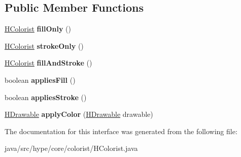\subsection*{Public Member Functions}
\begin{DoxyCompactItemize}
\item 
\hypertarget{interfacehype_1_1core_1_1colorist_1_1_h_colorist_a1d46be9eae6e5b1284e2f2ce235ecbe8}{\hyperlink{interfacehype_1_1core_1_1colorist_1_1_h_colorist}{H\-Colorist} {\bfseries fill\-Only} ()}\label{interfacehype_1_1core_1_1colorist_1_1_h_colorist_a1d46be9eae6e5b1284e2f2ce235ecbe8}

\item 
\hypertarget{interfacehype_1_1core_1_1colorist_1_1_h_colorist_a81c290b73d5f6a86694c00118c523723}{\hyperlink{interfacehype_1_1core_1_1colorist_1_1_h_colorist}{H\-Colorist} {\bfseries stroke\-Only} ()}\label{interfacehype_1_1core_1_1colorist_1_1_h_colorist_a81c290b73d5f6a86694c00118c523723}

\item 
\hypertarget{interfacehype_1_1core_1_1colorist_1_1_h_colorist_a4b4d31d2e5d8476088d25307b640f6aa}{\hyperlink{interfacehype_1_1core_1_1colorist_1_1_h_colorist}{H\-Colorist} {\bfseries fill\-And\-Stroke} ()}\label{interfacehype_1_1core_1_1colorist_1_1_h_colorist_a4b4d31d2e5d8476088d25307b640f6aa}

\item 
\hypertarget{interfacehype_1_1core_1_1colorist_1_1_h_colorist_a80ee6723be22065ceea6a8f6ae1fe58c}{boolean {\bfseries applies\-Fill} ()}\label{interfacehype_1_1core_1_1colorist_1_1_h_colorist_a80ee6723be22065ceea6a8f6ae1fe58c}

\item 
\hypertarget{interfacehype_1_1core_1_1colorist_1_1_h_colorist_ad62324489bedb5b729095122943279ad}{boolean {\bfseries applies\-Stroke} ()}\label{interfacehype_1_1core_1_1colorist_1_1_h_colorist_ad62324489bedb5b729095122943279ad}

\item 
\hypertarget{interfacehype_1_1core_1_1colorist_1_1_h_colorist_aa83c162c9ff4c60a6617268e7f1c16d5}{\hyperlink{classhype_1_1core_1_1drawable_1_1_h_drawable}{H\-Drawable} {\bfseries apply\-Color} (\hyperlink{classhype_1_1core_1_1drawable_1_1_h_drawable}{H\-Drawable} drawable)}\label{interfacehype_1_1core_1_1colorist_1_1_h_colorist_aa83c162c9ff4c60a6617268e7f1c16d5}

\end{DoxyCompactItemize}


The documentation for this interface was generated from the following file\-:\begin{DoxyCompactItemize}
\item 
java/src/hype/core/colorist/H\-Colorist.\-java\end{DoxyCompactItemize}
